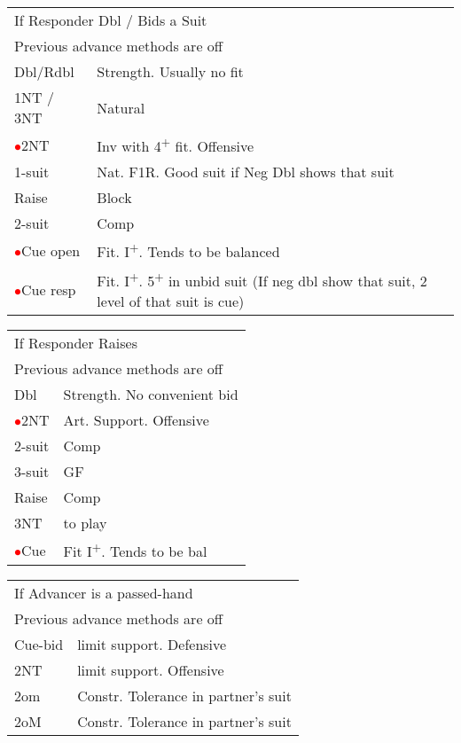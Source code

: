 \documentclass{article}
\newcommand{\nt}{\relsize{-1}NT\relsize{1}}
\newcommand{\up}{\textsuperscript{+}}
\newcommand{\al}{\textcolor{red}{$\bullet$}}
\begin{document}
\medskip

\begin{tabular}{|l|p{6.5cm}}
	\multicolumn{2}{l}{If Responder Dbl / Bids a Suit} \\
	\multicolumn{2}{l}{Previous advance methods are off} \\
	Dbl/Rdbl & Strength. Usually no fit \\
	1\nt{} / 3\nt{} & Natural \\
	\al{}2\nt{} & Inv with 4\up{} fit. Offensive \\
	1-suit & Nat. F1R. Good suit if Neg Dbl shows that suit \\
	Raise & Block \\
	2-suit & Comp \\
	\al{}Cue open & Fit. I\up{}. Tends to be balanced \\
	\al{}Cue resp & Fit. I\up{}. 5\up{} in unbid suit (If neg dbl show that suit, 2 level of that suit is cue) \\
\end{tabular}

\medskip

\begin{tabular}{|l|p{6.5cm}}
	\multicolumn{2}{l}{If Responder Raises} \\
	\multicolumn{2}{l}{Previous advance methods are off} \\
	Dbl & Strength. No convenient bid \\
	\al{}2\nt{} & Art. Support. Offensive \\
	2-suit & Comp \\
	3-suit & GF \\
	Raise & Comp \\
	3\nt{} & to play \\
	\al{}Cue & Fit I\up{}. Tends to be bal \\
\end{tabular}

\medskip

\begin{tabular}{|l|p{6.5cm}}
	\multicolumn{2}{l}{If Advancer is a passed-hand} \\
	\multicolumn{2}{l}{Previous advance methods are off} \\
	Cue-bid & limit support. Defensive \\
	2\nt{} & limit support. Offensive \\
	2om & Constr. Tolerance in partner's suit \\
	2oM & Constr. Tolerance in partner's suit
\end{tabular}
\end{document}
